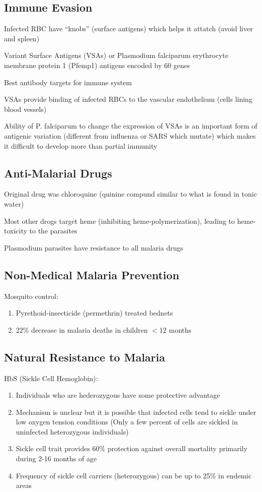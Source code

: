 \documentclass{notes}
\begin{document}
\subsection*{Immune Evasion}
Infected RBC have ``knobs'' (surface antigens) which helps it attatch (avoid liver and spleen)

\tab \indicates Variant Surface Antigens (VSAs) or Plasmodium falciparum erythrocyte membrane protein 1 (Pfemp1) antigens encoded by 60 genes

Best antibody targets for immune system

VSAs provide binding of infected RBCs to the vascular endothelium (cells lining blood vessels)

Ability of P. falciparum to change the expression of VSAs is an important form of antigenic variation (different from influenza or SARS which mutate) which makes it difficult to develop more than partial immunity

\subsection*{Anti-Malarial Drugs}

Original drug was chloroquine (quinine compund similar to what is found in tonic water)

Most other drogs target heme (inhibiting heme-polymerization), leading to heme-toxicity to the parasites

Plasmodium parasites have resistance to all malaria drugs

\subsection*{Non-Medical Malaria Prevention}

Mosquito control:
\begin{enumerate}
    \item Pyrethoid-insecticide (permethrin) treated bednets
    \item 22\% decrease in malaria deaths in children \(<\)12 months
\end{enumerate}

\subsection*{Natural Resistance to Malaria}

HbS (Sickle Cell Hemoglobin):
\begin{enumerate}
    \item Individuals who are hederozygous have some protective advantage
    \item Mechanism is unclear but it is possible that infected cells tend to sickle under low oxygen tension conditions (Only a few percent of cells are sickled in uninfected heterozygous individuals)
    \item Sickle cell trait provides 60\% protection against overall mortality primarily during 2-16 months of age
    \item Frequency of sickle cell carriers (heterozygous) can be up to 25\% in endemic areas
\end{enumerate}
\end{document}
